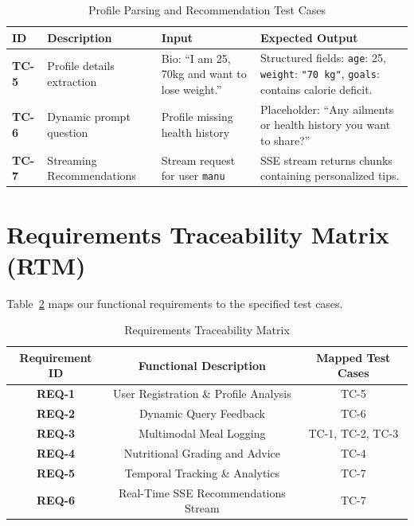 \documentclass[12pt,a4paper,oneside]{report}
\begin{document}
\begin{table}[H]
    \centering
    \caption{Profile Parsing and Recommendation Test Cases}
    \label{tab:tc_recommender}
    \begin{tabular}{p{1cm}p{4cm}p{4cm}p{4.5cm}}
        \toprule
        \textbf{ID} & \textbf{Description} & \textbf{Input} & \textbf{Expected Output} \\
        \midrule
        \textbf{TC-5} & Profile details extraction & Bio: ``I am 25, 70kg and want to lose weight.'' & Structured fields: \texttt{age}: 25, \texttt{weight}: \texttt{"70 kg"}, \texttt{goals}: contains calorie deficit. \\
        \textbf{TC-6} & Dynamic prompt question & Profile missing health history & Placeholder: ``Any ailments or health history you want to share?'' \\
        \textbf{TC-7} & Streaming Recommendations & Stream request for user \texttt{manu} & SSE stream returns chunks containing personalized tips. \\
        \bottomrule
    \end{tabular}
\end{table}

\section{Requirements Traceability Matrix (RTM)}
Table~\ref{tab:rtm} maps our functional requirements to the specified test cases.

\begin{table}[H]
    \centering
    \caption{Requirements Traceability Matrix}
    \label{tab:rtm}
    \begin{tabular}{ccc}
        \toprule
        \textbf{Requirement ID} & \textbf{Functional Description} & \textbf{Mapped Test Cases} \\
        \midrule
        \textbf{REQ-1} & User Registration \& Profile Analysis & TC-5 \\
        \textbf{REQ-2} & Dynamic Query Feedback & TC-6 \\
        \textbf{REQ-3} & Multimodal Meal Logging & TC-1, TC-2, TC-3 \\
        \textbf{REQ-4} & Nutritional Grading and Advice & TC-4 \\
        \textbf{REQ-5} & Temporal Tracking \& Analytics & TC-7 \\
        \textbf{REQ-6} & Real-Time SSE Recommendations Stream & TC-7 \\
        \bottomrule
    \end{tabular}
\end{table}
\end{document}

